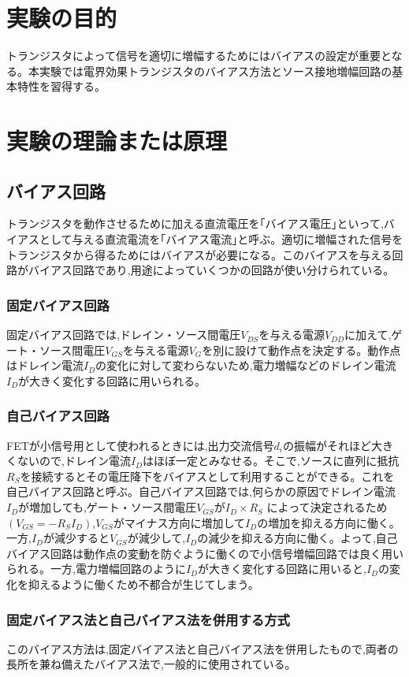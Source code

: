 \documentclass[a4paper,11pt,xelatex,ja=standard]{bxjsarticle}
\begin{document}
\section{実験の目的}

    トランジスタによって信号を適切に増幅するためにはバイアスの設定が重要となる。本実験では電界効果トランジスタのバイアス方法とソース接地増幅回路の基本特性を習得する。

\section{実験の理論または原理}
    \subsection{バイアス回路}
        トランジスタを動作させるために加える直流電圧を｢バイアス電圧｣といって,バイアスとして与える直流電流を｢バイアス電流｣と呼ぶ。適切に増幅された信号をトランジスタから得るためにはバイアスが必要になる。このバイアスを与える回路がバイアス回路であり,用途によっていくつかの回路が使い分けられている。
        \subsubsection{固定バイアス回路}
            固定バイアス回路では,ドレイン・ソース間電圧$V_{DS}$を与える電源$V_{DD}$に加えて,ゲート・ソース間電圧$V_{GS}$を与える電源$V_G$を別に設けて動作点を決定する。動作点はドレイン電流$I_D$の変化に対して変わらないため,電力増幅などのドレイン電流$I_D$が大きく変化する回路に用いられる。
        \subsubsection{自己バイアス回路}
            FETが小信号用として使われるときには,出力交流信号$d_i$の振幅がそれほど大きくないので,ドレイン電流$I_D$はほぼ一定とみなせる。そこで,ソースに直列に抵抗$R_S$を接続するとその電圧降下をバイアスとして利用することができる。これを自己バイアス回路と呼ぶ。自己バイアス回路では,何らかの原因でドレイン電流$I_D$が増加しても,ゲート・ソース間電圧$V_{GS}$が$I_D \times R_S$ によって決定されるため$(V_{GS} = - R_S I_D)$,$V_{GS}$がマイナス方向に増加して$I_D$の増加を抑える方向に働く。一方,$I_D$が減少すると$V_{GS}$が減少して,$I_D$の減少を抑える方向に働く。よって,自己バイアス回路は動作点の変動を防ぐように働くので小信号増幅回路では良く用いられる。一方,電力増幅回路のように$I_D$が大きく変化する回路に用いると,$I_D$の変化を抑えるように働くため不都合が生じてしまう。
        \subsubsection{固定バイアス法と自己バイアス法を併用する方式}
            このバイアス方法は,固定バイアス法と自己バイアス法を併用したもので,両者の長所を兼ね備えたバイアス法で,一般的に使用されている。
\end{document}
